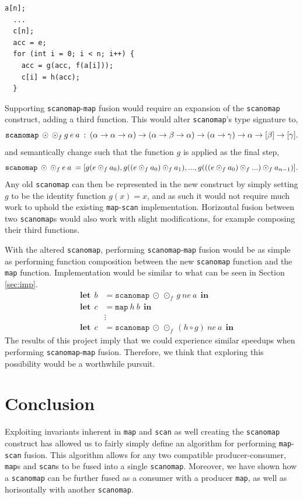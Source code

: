 \documentclass[11pt,bibliography=totocnumbered]{article}
\newcommand\lett{\phantom{-}\:\:\mathbf{let}\:\:}
\newcommand\inn{\:\:\mathbf{in}\:\:}
\begin{document}
\begin{lstlisting}[caption=Listing \ref{lst:maposcanomap1} fused., label={lst:mos1}]
  a[n];
  ...
  c[n];
  acc = e;
  for (int i = 0; i < n; i++) {
    acc = g(acc, f(a[i]));
    c[i] = h(acc);
  }
\end{lstlisting}
Supporting \texttt{scanomap}-\texttt{map} fusion would require an expansion of the \texttt{scanomap} construct, adding a third function. This would alter \texttt{scanomap}'s type signature to,
$$\mathtt{scanomap} \: \odot \: \odot_f \: g \: e \: a \: : \:(\alpha \to \alpha \to \alpha) \to (\alpha \to \beta \to \alpha)
 \to (\alpha \to \gamma) \to \alpha \to [\beta] \to [\gamma]\mathnormal{.}$$
and semantically change such that the function $g$ is applied as the final step,
$$\mathtt{scanomap} \: \odot \: \odot_f \: e \: a \: =
 [g(e \odot_f a_0), g((e \odot_f a_0) \odot_f a_1), ..., g(((e \odot_f a_0) \odot_f ...) \odot_f a_{n-1})]\mathnormal{.}$$
Any old \texttt{scanomap} can then be represented in the new construct by simply setting $g$ to be the identity function $g(x) = x$, and as such it would not require much work to uphold the
 existing \texttt{map}-\texttt{scan} implementation. Horizontal fusion between two \texttt{scanomap}s would also work with slight modifications, for example composing their third functions.

With the altered \texttt{scanomap}, performing \texttt{scanomap}-\texttt{map} fusion would be as simple as performing function composition between the new \texttt{scanomap} function and 
the \texttt{map} function. Implementation would be similar to what can be seen in Section \ref{sec:imp}.
 \begin{align*}
   \lett b &= \mathtt{scanomap} \: \odot \: \odot_f \: g \: ne \: a \inn \\
   \lett c &= \mathtt{map} \: h \: b \inn \\
   &\vdots \\
   \lett c &= \mathtt{scanomap} \: \odot \: \odot_f \: (h \circ g) \: ne \: a \inn
 \end{align*}
The results of this project imply that we could experience similar speedups when performing \texttt{scanomap}-\texttt{map} fusion. Therefore, we think that exploring this possibility
 would be a worthwhile pursuit.
\clearpage
\section{Conclusion}
Exploiting invariants inherent in \texttt{map} and \texttt{scan} as well creating the \texttt{scanomap} construct has allowed us
 to fairly simply define an algorithm for performing \texttt{map}-\texttt{scan} fusion. This algorithm allows for any two compatible
 producer-consumer, \texttt{map}s and \texttt{scan}s to be fused into a single \texttt{scanomap}. Moreover, we have shown
how a \texttt{scanomap}  can
 be further fused as a consumer with a producer \texttt{map}, as well as horisontally with another \texttt{scanomap}.
\end{document}
